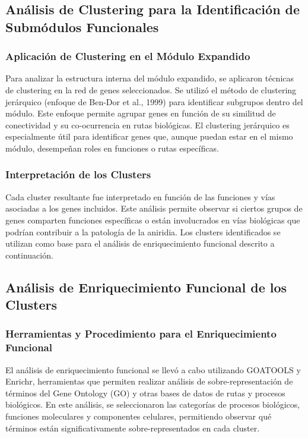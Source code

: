 \subsection{Análisis de Clustering para la Identificación de Submódulos Funcionales}
\subsubsection{Aplicación de Clustering en el Módulo Expandido}

Para analizar la estructura interna del módulo expandido, se aplicaron técnicas de clustering en la red de genes seleccionados. Se utilizó el método de clustering jerárquico (enfoque de Ben-Dor et al., 1999) para identificar subgrupos dentro del módulo. Este enfoque permite agrupar genes en función de su similitud de conectividad y su co-ocurrencia en rutas biológicas. El clustering jerárquico es especialmente útil para identificar genes que, aunque puedan estar en el mismo módulo, desempeñan roles en funciones o rutas específicas.

\subsubsection{Interpretación de los Clusters}

Cada cluster resultante fue interpretado en función de las funciones y vías asociadas a los genes incluidos. Este análisis permite observar si ciertos grupos de genes comparten funciones específicas o están involucrados en vías biológicas que podrían contribuir a la patología de la aniridia. Los clusters identificados se utilizan como base para el análisis de enriquecimiento funcional descrito a continuación.

\subsection{Análisis de Enriquecimiento Funcional de los Clusters}
\subsubsection{Herramientas y Procedimiento para el Enriquecimiento Funcional}

El análisis de enriquecimiento funcional se llevó a cabo utilizando GOATOOLS y Enrichr, herramientas que permiten realizar análisis de sobre-representación de términos del Gene Ontology (GO) y otras bases de datos de rutas y procesos biológicos. En este análisis, se seleccionaron las categorías de procesos biológicos, funciones moleculares y componentes celulares, permitiendo observar qué términos están significativamente sobre-representados en cada cluster.

